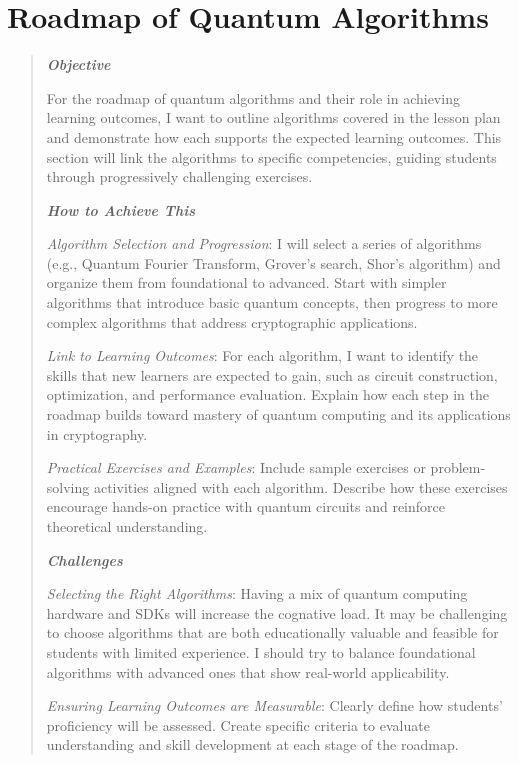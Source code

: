 \section{Roadmap of Quantum Algorithms}

\begin{quote}\itshape
\textbf{Objective}

For the roadmap of quantum algorithms and their role in achieving learning outcomes, I want to outline algorithms covered
in the lesson plan and demonstrate how each supports the expected learning outcomes. 
This section will link the algorithms to specific competencies, guiding students through progressively challenging exercises.

\textbf{\emph{How to Achieve This}}

\emph{Algorithm Selection and Progression}: I will select a series of algorithms (e.g., Quantum Fourier Transform, 
Grover’s search, Shor’s algorithm) and organize them from foundational to advanced. 
Start with simpler algorithms that introduce basic quantum concepts, then progress to more complex algorithms that address cryptographic applications.

\emph{Link to Learning Outcomes}: For each algorithm, I want to identify the skills that new learners are expected to gain, 
such as circuit construction, optimization, and performance evaluation. Explain how each step in the roadmap builds toward 
mastery of quantum computing and its applications in cryptography.

\emph{Practical Exercises and Examples}: Include sample exercises or problem-solving activities aligned with each algorithm. 
Describe how these exercises encourage hands-on practice with quantum circuits and reinforce theoretical understanding.

\textbf{\emph{Challenges}}

\emph{Selecting the Right Algorithms}: Having a mix of quantum computing hardware and SDKs will increase the cognative load.
It may be challenging to choose algorithms that are both educationally valuable and feasible for students with limited experience. 
I should try to balance foundational algorithms with advanced ones that show real-world applicability.

\emph{Ensuring Learning Outcomes are Measurable}: Clearly define how students’ proficiency will be assessed. 
Create specific criteria to evaluate understanding and skill development at each stage of the roadmap.
\end{quote}\ignorespacesafterend

